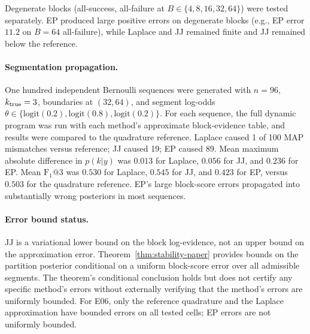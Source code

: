 Degenerate blocks (all-success, all-failure at $B\in\{4,8,16,32,64\}$) were tested
separately. EP produced large positive errors on degenerate blocks (e.g., EP error
$11.2$ on $B=64$ all-failure), while Laplace and JJ remained finite and JJ remained
below the reference.

\paragraph{Segmentation propagation.}
One hundred independent Bernoulli sequences were generated with $n=96$,
$k_{\rm true}=3$, boundaries at $(32,64)$, and segment log-odds
$\theta\in\{\mathrm{logit}(0.2),\mathrm{logit}(0.8),\mathrm{logit}(0.2)\}$.
For each sequence, the full dynamic program was run with each method's approximate
block-evidence table, and results were compared to the quadrature reference.
Laplace caused 1 of 100 MAP mismatches versus reference; JJ caused 19; EP caused 89.
Mean maximum absolute difference in $p(k|y)$ was $0.013$ for Laplace, $0.056$ for JJ,
and $0.236$ for EP. Mean $\mathrm{F}_1@3$ was $0.530$ for Laplace, $0.545$ for JJ,
and $0.423$ for EP, versus $0.503$ for the quadrature reference.
EP's large block-score errors propagated into substantially wrong posteriors in most
sequences.

\paragraph{Error bound status.}
JJ is a variational lower bound on the block log-evidence, not an upper bound on the
approximation error. Theorem~\ref{thm:stability-paper} provides bounds on the partition
posterior conditional on a uniform block-score error over all admissible segments. The
theorem's conditional conclusion holds but does not certify any specific method's errors
without externally verifying that the method's errors are uniformly bounded. For E06, only
the reference quadrature and the Laplace approximation have bounded errors on all tested
cells; EP errors are not uniformly bounded.





\FloatBarrier
